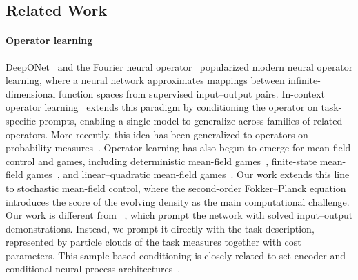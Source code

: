 \documentclass[preprint]{elsarticle}
\begin{document}
\subsection{Related Work}\label{sec:related}

\paragraph{Operator learning}
DeepONet~\cite{lu2021deeponet} and the Fourier neural operator~\cite{li2021fno} popularized modern neural operator learning, where a neural network approximates mappings between infinite-dimensional function spaces from supervised input--output pairs. In-context operator learning~\cite{yang2023icon} extends this paradigm by conditioning the operator on task-specific prompts, enabling a single model to generalize across families of related operators. More recently, this idea has been generalized to operators on probability measures~\cite{cole2026incontextoperatorlearningspace}. Operator learning has also begun to emerge for mean-field control and games, including deterministic mean-field games~\cite{huang2025unsupervised}, finite-state mean-field games~\cite{hofgard2026operator}, and linear--quadratic mean-field games~\cite{firoozi2025simultaneously}. Our work extends this line to stochastic mean-field control, where the second-order Fokker--Planck equation introduces the score of the evolving density as the main computational challenge. Our work is different from ~\cite{garg2022icl}, which prompt the network with solved input--output demonstrations. Instead, we prompt it directly with the task description, represented by particle clouds of the task measures together with cost parameters. This sample-based conditioning is closely related to set-encoder and conditional-neural-process architectures~\cite{garnelo2018cnp,zaheer2017deepsets,lee2019settransformer}.
\end{document}
